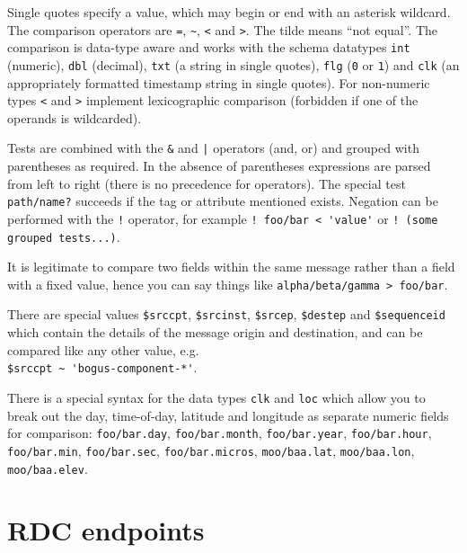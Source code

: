 \documentclass[12pt,a4paper,twoside]{article}
\renewcommand{\_}{\texttt{\symbol{95}}}
\begin{document}
Single quotes specify a value, which may begin or end with an asterisk
wildcard.
The comparison operators are
\texttt{=}, \verb^~^, \texttt{<} and \texttt{>}. The tilde
means ``not equal''. The comparison is data-type aware and works
with the schema datatypes \texttt{int} (numeric),
\texttt{dbl} (decimal), \texttt{txt} (a string in single quotes),
\texttt{flg} (\verb^0^ or \verb^1^) and
\texttt{clk} (an appropriately formatted timestamp string in single quotes).
For non-numeric types \texttt{<} and \texttt{>} implement
lexicographic comparison (forbidden if one of the operands is
wildcarded).

Tests are combined with the \verb^&^ and \verb^|^ operators (and, or)
and grouped with parentheses as required. In the absence of parentheses
expressions are parsed from left to right (there is no precedence
for operators). The special test \verb=path/name?= succeeds if
the tag or attribute mentioned exists. Negation can be performed
with the \texttt{!} operator, for example \verb^! foo/bar < 'value'^
or \verb^! (some grouped tests...)^.

It is legitimate to compare two fields within the same message
rather than a field with a fixed value, hence you can say things like
\verb^alpha/beta/gamma > foo/bar^.

There are special values
\verb^$srccpt^, \verb^$srcinst^, \verb^$srcep^, \verb^$destep^ and
\verb^$sequenceid^ which contain the details of
the message origin and destination, and can be compared like any
other value, e.g.\\
\verb^$srccpt ~ 'bogus-component-*'^.

There is a special syntax for the data types \verb^clk^ and
\verb^loc^ which allow you to break out the day, time-of-day, latitude
and longitude as separate numeric fields for comparison:
\verb^foo/bar.day^, \verb^foo/bar.month^,
\verb^foo/bar.year^, \verb^foo/bar.hour^, \verb^foo/bar.min^,
\verb^foo/bar.sec^, \verb^foo/bar.micros^, \verb^moo/baa.lat^,
\verb^moo/baa.lon^, \verb^moo/baa.elev^.

\newpage
\section{RDC endpoints}
\end{document}
